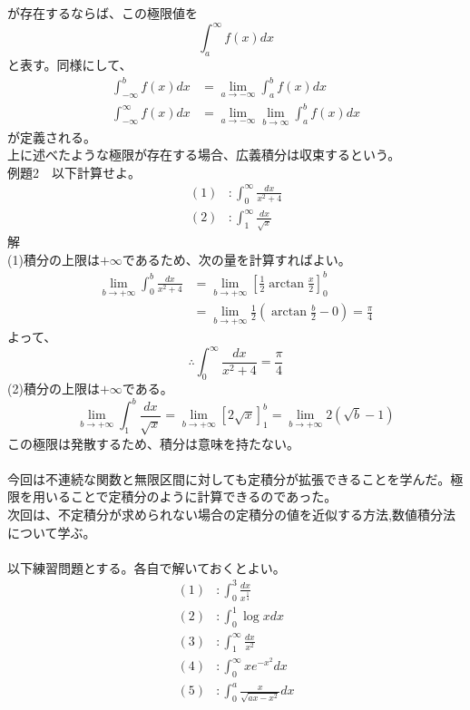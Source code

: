 \documentclass[a4j,dvipdfmx]{jsarticle}
\begin{document}
が存在するならば、この極限値を
\begin{equation}
    \int_a^{\infty}f(x)dx
\end{equation}
と表す。同様にして、
\begin{align}
    \int_{-\infty}^bf(x)dx&=\lim_{a\to-\infty}\int_a^bf(x)dx\\
    \int_{-\infty}^{\infty}f(x)dx&=\lim_{a\to-\infty}\lim_{b\to\infty}\int_a^bf(x)dx
\end{align}
が定義される。\\
上に述べたような極限が存在する場合、広義積分は収束するという。\\
例題2　以下計算せよ。\\
\begin{align*}
    (1)&:\int_0^{\infty}\frac{dx}{x^2+4}\\
    (2)&:\int_1^{\infty}\frac{dx}{\sqrt{x}}
\end{align*}
解\\
(1)積分の上限は$+\infty$であるため、次の量を計算すればよい。\\
\begin{align*}
    \lim_{b\to+\infty}\int_0^b\frac{dx}{x^2+4}&=\lim_{b\to+\infty}[\frac{1}{2}\arctan\frac{x}{2}]_0^b\\
    &=\lim_{b\to+\infty}\frac{1}{2}(\arctan\frac{b}{2}-0)=\frac{\pi}{4}
\end{align*}
よって、
\begin{equation*}
    \therefore \int_0^{\infty}\frac{dx}{x^2+4} =\frac{\pi}{4}
\end{equation*}
(2)積分の上限は$+\infty$である。
\begin{equation*}
    \lim_{b\to+\infty}\int_1^{b}\frac{dx}{\sqrt{x}}=\lim_{b\to+\infty}[2\sqrt{x}]_1^b=\lim_{b\to+\infty}2(\sqrt{b}-1)
\end{equation*}
この極限は発散するため、積分は意味を持たない。\\\\
今回は不連続な関数と無限区間に対しても定積分が拡張できることを学んだ。極限を用いることで定積分のように計算できるのであった。\\
次回は、不定積分が求められない場合の定積分の値を近似する方法,数値積分法について学ぶ。\\\\
以下練習問題とする。各自で解いておくとよい。\\
\begin{align*}
    (1)&:\int_0^3\frac{dx}{x^{\frac{1}{4}}}\\
    (2)&:\int_0^1\log xdx\\
    (3)&:\int_1^{\infty}\frac{dx}{x^2}\\
    (4)&:\int_0^{\infty}xe^{-x^2}dx\\
    (5)&:\int_0^a\frac{x}{\sqrt{ax-x^2}}dx
\end{align*}
\end{document}
